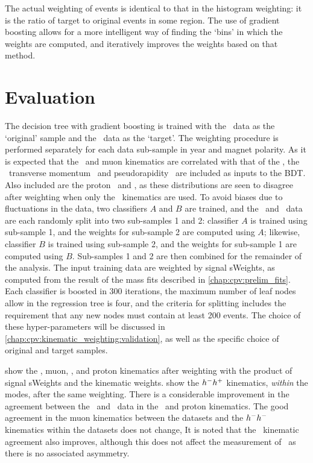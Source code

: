 The actual weighting of events is identical to that in the histogram weighting: 
it is the ratio of target to original events in some region.
The use of gradient boosting allows for a more intelligent way of finding the 
`bins' in which the weights are computed, and iteratively improves the weights 
based on that method.

\section{Evaluation}
\label{chap:cpv:kinematic_weighting:evaluation}

The decision tree with gradient boosting is trained with the \ppipi\ data as 
the `original' sample and the \pKK\ data as the `target'.
The weighting procedure is performed separately for each data sub-sample in 
year and magnet polarity.
As it is expected that the \PLambdab\ and muon kinematics are correlated with 
that of the \PLambdac, the \PLambdac\ transverse momentum \pT\ and 
pseudorapidity \Eta\ are included as inputs to the \ac{BDT}.
Also included are the proton \pT\ and \Eta, as these distributions are seen to 
disagree after weighting when only the \PLambdac\ kinematics are used.
To avoid biases due to fluctuations in the data, two classifiers $A$ and $B$ 
are trained, and the \pKK\ and \ppipi\ data are each randomly split into two 
sub-samples 1 and 2: classifier $A$ is trained using sub-sample 1, and the 
weights for sub-sample 2 are computed using $A$; likewise, classifier $B$ is 
trained using sub-sample 2, and the weights for sub-sample 1 are computed using 
$B$.
Sub-samples 1 and 2 are then combined for the remainder of the analysis.
The input training data are weighted by signal sWeights, as computed from the 
result of the mass fits described in \cref{chap:cpv:prelim_fits}.
Each classifier is boosted in 300 iterations, the maximum number of leaf nodes 
allow in the regression tree is four, and the criteria for splitting includes 
the requirement that any new nodes must contain at least 200 events.
The choice of these hyper-parameters will be discussed in 
\cref{chap:cpv:kinematic_weighting:validation}, as well as the specific choice 
of original and target samples.

show the \PLambdab, muon, \PLambdac, and proton kinematics after weighting with 
the product of signal sWeights and the kinematic weights.
show the $h^{-}h^{+}$ kinematics, \emph{within} the modes, after the same 
weighting.
There is a considerable improvement in the agreement between the \pKK\ and 
\ppipi\ data in the \PLambdab\ and proton kinematics.
The good agreement in the muon kinematics between the datasets and the 
$h^{-}h^{-}$ kinematics within the datasets does not change,
It is noted that the \PLambdac\ kinematic agreement also improves, although 
this does not affect the measurement of \dACP\ as there is no associated 
asymmetry.

